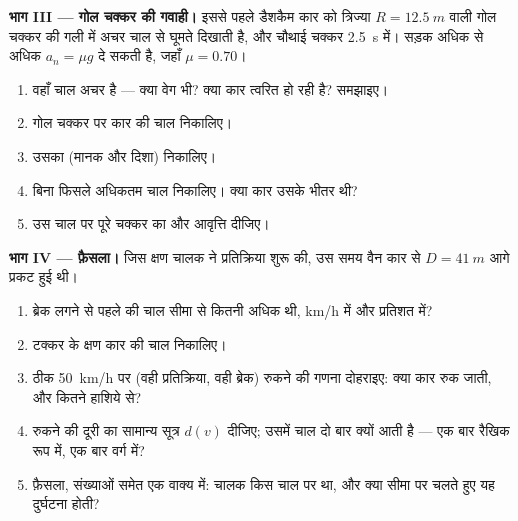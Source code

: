 \begin{problem}
\medskip
\noindent\textbf{भाग III --- गोल चक्कर की गवाही।}
इससे पहले डैशकैम कार को त्रिज्या $R = \qty{12.5}{m}$ वाली गोल चक्कर की गली में अचर
चाल से घूमते दिखाती है, और चौथाई चक्कर \qty{2.5}{s} में। सड़क अधिक से अधिक
$a_n = \mu g$ दे सकती है, जहाँ $\mu = 0.70$।
\begin{enumerate}[resume]
  \item वहाँ चाल अचर है --- क्या वेग भी? क्या कार त्वरित हो रही है?
        समझाइए।
  \item गोल चक्कर पर कार की चाल निकालिए।
  \item उसका  (मानक और दिशा) निकालिए।
  \item बिना फिसले अधिकतम चाल निकालिए। क्या कार उसके भीतर थी?
  \item उस चाल पर पूरे चक्कर का  और
        आवृत्ति दीजिए।
\end{enumerate}

\medskip
\noindent\textbf{भाग IV --- फ़ैसला।}
जिस क्षण चालक ने प्रतिक्रिया शुरू की, उस समय वैन कार से $D = \qty{41}{m}$ आगे प्रकट हुई
थी।
\begin{enumerate}[resume]
  \item ब्रेक लगने से पहले की चाल सीमा से कितनी अधिक थी, \unit{km/h} में
        और प्रतिशत में?
  \item टक्कर के क्षण कार की चाल निकालिए।
  \item ठीक \qty{50}{km/h} पर (वही प्रतिक्रिया, वही ब्रेक) रुकने की गणना दोहराइए:
        क्या कार रुक जाती, और कितने हाशिये से?
  \item रुकने की दूरी का सामान्य सूत्र $d(v)$ दीजिए; उसमें चाल दो
        बार क्यों आती है --- एक बार रैखिक रूप में, एक बार वर्ग में?
  \item फ़ैसला, संख्याओं समेत एक वाक्य में: चालक किस चाल पर था, और
        क्या सीमा पर चलते हुए यह दुर्घटना होती?
\end{enumerate}
\end{problem}
